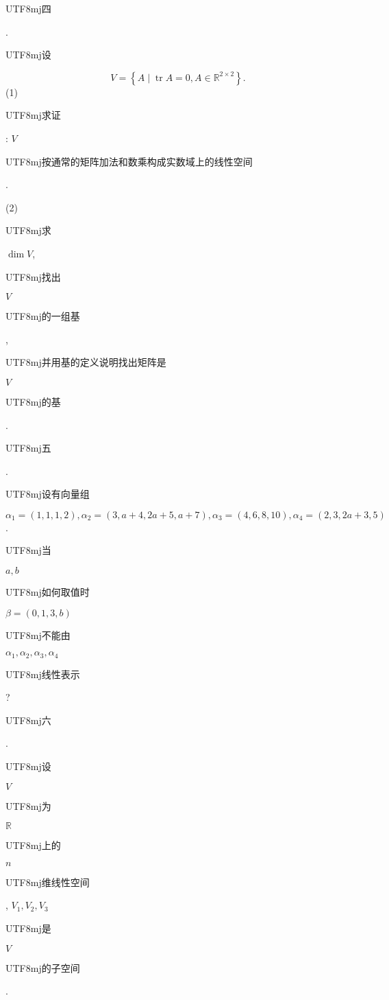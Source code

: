 \documentclass[10pt]{article}
\begin{document}
\begin{CJK}{UTF8}{mj}四\end{CJK}. \begin{CJK}{UTF8}{mj}设\end{CJK}
$$
V=\left\{A \mid \operatorname{tr} A=0, A \in \mathbb{R}^{2 \times 2}\right\} .
$$
(1) \begin{CJK}{UTF8}{mj}求证\end{CJK}: $V$ \begin{CJK}{UTF8}{mj}按通常的矩阵加法和数乘构成实数域上的线性空间\end{CJK}.

(2) \begin{CJK}{UTF8}{mj}求\end{CJK} $\operatorname{dim} V$, \begin{CJK}{UTF8}{mj}找出\end{CJK} $V$ \begin{CJK}{UTF8}{mj}的一组基\end{CJK}, \begin{CJK}{UTF8}{mj}并用基的定义说明找出矩阵是\end{CJK} $V$ \begin{CJK}{UTF8}{mj}的基\end{CJK}.

\begin{CJK}{UTF8}{mj}五\end{CJK}. \begin{CJK}{UTF8}{mj}设有向量组\end{CJK} $\alpha_{1}=(1,1,1,2), \alpha_{2}=(3, a+4,2 a+5, a+7), \alpha_{3}=(4,6,8,10), \alpha_{4}=(2,3,2 a+3,5)$. \begin{CJK}{UTF8}{mj}当\end{CJK} $a, b$ \begin{CJK}{UTF8}{mj}如何取值时\end{CJK} $\beta=(0,1,3, b)$ \begin{CJK}{UTF8}{mj}不能由\end{CJK} $\alpha_{1}, \alpha_{2}, \alpha_{3}, \alpha_{4}$ \begin{CJK}{UTF8}{mj}线性表示\end{CJK}?

\begin{CJK}{UTF8}{mj}六\end{CJK}. \begin{CJK}{UTF8}{mj}设\end{CJK} $V$ \begin{CJK}{UTF8}{mj}为\end{CJK} $\mathbb{R}$ \begin{CJK}{UTF8}{mj}上的\end{CJK} $n$ \begin{CJK}{UTF8}{mj}维线性空间\end{CJK}, $V_{1}, V_{2}, V_{3}$ \begin{CJK}{UTF8}{mj}是\end{CJK} $V$ \begin{CJK}{UTF8}{mj}的子空间\end{CJK}.
\end{document}
